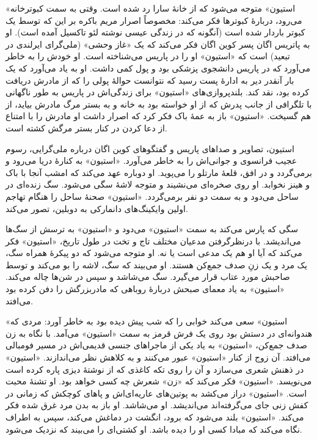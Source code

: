 \documentclass[12pt]{book}
\newcommand{\noun}[1]{«{#1}»}
\begin{document}
    \noun{استیون} متوجه می‌شود که از خانۀ سارا رد شده است. وقتی به سمت کبوترخانه می‌رود، دربارۀ کبوترها فکر می‌کند: مخصوصاً اصرار مریم باکره بر این که توسط یک کبوتر باردار شده است (آنگونه که در زندگی عیسی نوشته لئو تاکسیل آمده است). او به پاتریس اگان پسر کوین اگان فکر می‌کند که یک «غاز وحشی» (ملی‌گرای ایرلندی در تبعید) است که \noun{استیون} او را در پاریس می‌شناخته است. او خودش را به خاطر می‌آورد که در پاریس دانشجوی پزشکی بود و پول کمی داشت. او به یاد می‌آورد که یک بار آنقدر دیر به ادارۀ پست رسید که نتوانست حوالۀ پولی را که از مادرش دریافت کرده بود، نقد کند. بلندپروازی‌های \noun{استیون} برای زندگی‌اش در پاریس به طور ناگهانی با تلگرافی از جانب پدرش که از او خواسته بود به خانه و به بستر مرگ مادرش بیاید، از هم گسیخت. \noun{استیون} باز به عمۀ باک فکر کرد که اصرار داشت او مادرش را با امتناع از دعا کردن در کنار بستر مرگش کشته است.

    استیون، تصاویر و صداهای پاریس و گفتگوهای کوین اگان درباره ملی‌گرایی، رسوم عجیب فرانسوی و جوانی‌اش را به خاطر می‌آورد. \noun{استیون} به کنارۀ دریا می‌رود و برمی‌گردد و در افق، قلعۀ مارتلو را می‌پوید. او دوباره عهد می‌کند که امشب آنجا با باک و هینز نخوابد. او روی صخره‌ای می‌نشیند و متوجه لاشۀ سگی می‌شود. سگ زنده‌ای در ساحل می‌دود و به سمت دو نفر برمی‌گردد. \noun{استیون} صحنۀ ساحل را هنگام تهاجم اولین وایکینگ‌های دانمارکی به دوبلین، تصور می‌کند.

    سگی که پارس می‌کند به سمت \noun{استیون} می‌دود و \noun{استیون} به ترسش از سگ‌ها می‌اندیشد. با درنظرگرفتن مدعیان مختلف تاج و تخت در طول تاریخ، \noun{استیون} فکر می‌کند که آیا او هم یک مدعی است یا نه. او متوجه می‌شود که دو پیکرۀ همراه سگ، یک مرد و یک زنِ صدف جمع‌کن هستند. او می‌بیند که سگ، لاشه را بو می‌کند و توسط صاحبش مورد عتاب قرار می‌گیرد. سگ می‌شاشد و سپس در شن‌ها چاله می‌کند. \noun{استیون} به یاد معمای صبحش دربارۀ روباهی که مادربزرگش را دفن کرده بود می‌افتد.

    \noun{استیون} سعی می‌کند خوابی را که شب پیش دیده بود به خاطر آورد: مردی که هندوانه‌ای در دستش بود روی یک فرش قرمز به سمت \noun{استیون} می‌آمد. با نگاه به زن صدف جمع‌کن، \noun{استیون} به یاد یکی از ماجراهای جنسی قدیمی‌اش در مسیر فومبالی می‌افتد. آن زوج از کنار \noun{استیون} عبور می‌کنند و به کلاهش نظر می‌اندازند. \noun{استیون} در ذهنش شعری می‌سازد و آن را روی تکه‌ کاغذی که از نوشتۀ دیزی پاره کرده است می‌نویسد. \noun{استیون} فکر می‌کند که «زن» شعرش چه کسی خواهد بود. او تشنۀ محبت است. \noun{استیون} دراز می‌کشد به پوتین‌های عاریه‌ای‌اش و پاهای کوچکش که زمانی در کفش زنی جای می‌گرفته‌اند می‌اندیشد. او می‌شاشد. او باز به بدن مرد غرق شده فکر می‌کند. \noun{استیون} بلند می‌شود که برود، انگشت در دماغش می‌کند، سپس به اطراف نگاه می‌کند که مبادا کسی او را دیده باشد. او کشتی‌ای را می‌بیند که نزدیک می‌شود.
\end{document}
